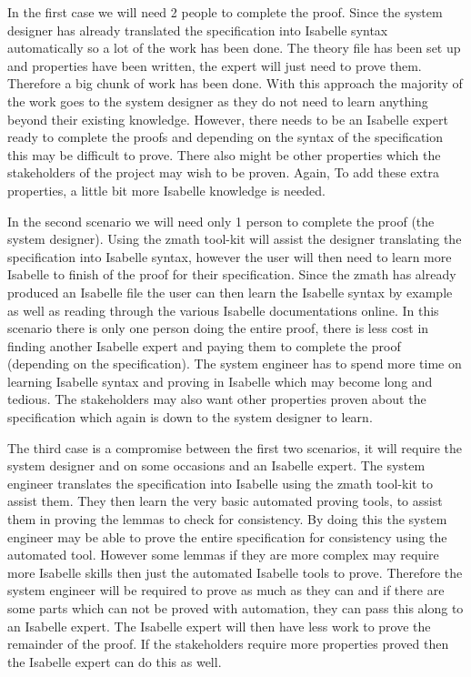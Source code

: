In the first case we will need 2 people to complete the proof. Since the system
designer has already translated the specification into Isabelle syntax
automatically so a lot of the work has been done. The theory file has been set
up and properties have been written, the expert will just need to prove them.
Therefore a big chunk of work has been done. With this approach the majority of
the work goes 
to the system designer as they do not need to learn anything beyond their
existing knowledge. However, there
needs to be an Isabelle expert ready to complete the proofs and depending on the
syntax of the specification this may be difficult to prove. There also might be
other properties which the stakeholders of the project may wish to be proven.
Again, To add these extra properties, a little bit more Isabelle knowledge is
needed.

In the second scenario we will need only 1 person to complete the proof (the
system designer). Using the \gls{zmath} tool-kit will assist the designer
translating the specification into Isabelle syntax, however the user will then
need to learn more Isabelle to finish of the proof for their specification.
Since the \gls{zmath} has already produced an Isabelle file the user can then
learn the Isabelle syntax by example as well as reading through the various
Isabelle documentations online. In this scenario 
there is only one person doing the entire proof, there is less cost in finding
another Isabelle expert and paying them to complete the proof (depending on
the specification). The system engineer has to spend more time on learning
Isabelle syntax and proving in Isabelle which may become long and tedious. The
stakeholders may also want other properties proven about the specification which
again is down to the system designer to learn.

The third case is a compromise between the first two scenarios, it will require
the system designer and on some occasions and an Isabelle expert. The system
engineer translates the specification into Isabelle using the \gls{zmath}
tool-kit to assist them. They then learn the very basic automated proving tools,
to assist them in proving the lemmas to check for consistency. By doing this the
system engineer may be able to prove the entire specification for consistency
using the automated tool. However some lemmas if they are more complex may
require more Isabelle skills then just the automated Isabelle tools to prove.
Therefore the system engineer will be required to prove as much as they can and
if there are some parts which can not be proved with automation, they can pass
this along to an Isabelle expert. The Isabelle expert will then have less work
to prove the remainder of the proof. If the stakeholders require more properties
proved then the Isabelle expert can do this as well.

